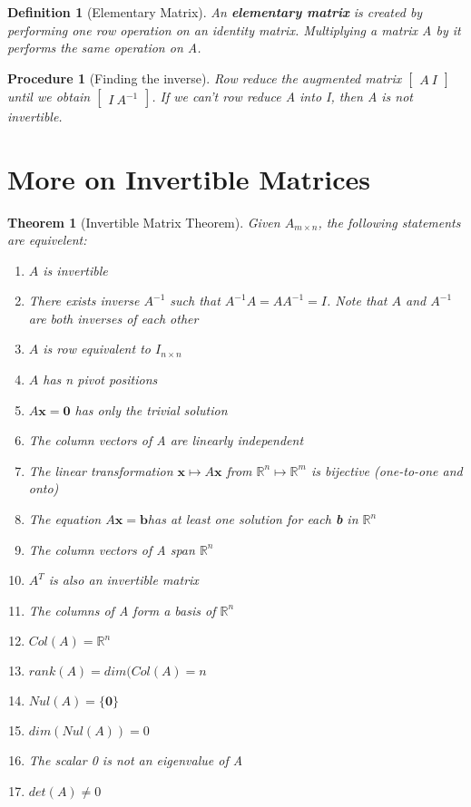 \documentclass[12pt]{report}
\newtheorem{thm}{Theorem}
\newtheorem{dfn}{Definition}
\newtheorem{proc}{Procedure}
\newcommand{\mtx}[3]{$#1_{#2\times #3}$}
\newcommand{\mateq}{$A\bm{x}=\bm{b}$}
\begin{document}
\begin{dfn}[Elementary Matrix]
An \textbf{elementary matrix} is created by performing one row operation on an identity matrix. Multiplying a matrix A by it performs the same operation on A.
\end{dfn}

\begin{proc}[Finding the inverse]
Row reduce the augmented matrix $\begin{bmatrix}A \: I \end{bmatrix}$ until we obtain $\begin{bmatrix}I \: A^{-1} \end{bmatrix}$. If we can't row reduce A into I, then A is not invertible.
\end{proc}

\section{More on Invertible Matrices}

\begin{thm}[Invertible Matrix Theorem]
Given \mtx{A}{m}{n}, the following statements are equivelent:

\begin{enumerate}
\item $A$ is invertible
\item There exists inverse $A^{-1}$ such that $A^{-1}A=AA^{-1}=I$. Note that $A$ and $A^{-1}$ are both inverses of each other
\item $A$ is row equivalent to \mtx{I}{n}{n}
\item $A$ has n pivot positions
\item $A\bm{x}=\bm{0}$ has only the trivial solution
\item The column vectors of A are linearly independent
\item The linear transformation $\bm{x} \mapsto A\bm{x}$ from $\mathbb{R}^n \mapsto \mathbb{R}^m$ is bijective (one-to-one and onto)
\item The equation \mateq has at least one solution for each \textbf{b} in $\mathbb{R}^n$
\item The column vectors of A span $\mathbb{R}^n$
\item $A^T$ is also an invertible matrix
\item The columns of A form a basis of $\mathbb{R}^n$
\item $Col(A)=\mathbb{R}^n$
\item $rank(A)=dim(Col(A)=n$
\item $Nul(A)=\{\bm{0}\}$
\item $dim(Nul(A))=0$
\item The scalar 0 is not an eigenvalue of A
\item $det(A) \neq 0$

\end{enumerate}
\end{thm}
\end{document}
